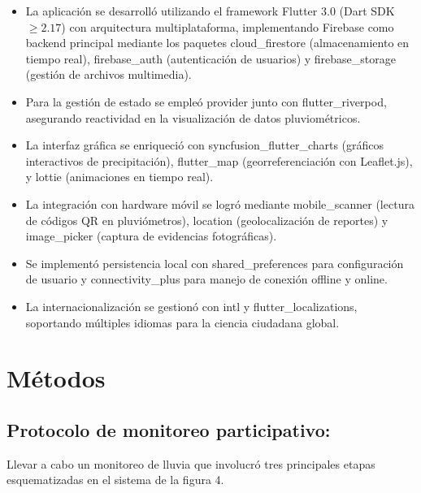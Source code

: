 \begin{itemize}
    \item La aplicación se desarrolló utilizando el framework Flutter 3.0 (Dart SDK $\geq2.17$) con arquitectura multiplataforma, implementando Firebase como backend principal mediante los paquetes cloud\_firestore (almacenamiento en tiempo real), firebase\_auth (autenticación de usuarios) y firebase\_storage (gestión de archivos multimedia). 

    \item Para la gestión de estado se empleó provider junto con flutter\_riverpod, asegurando reactividad en la visualización de datos pluviométricos. 
    
    \item La interfaz gráfica se enriqueció con syncfusion\_flutter\_charts (gráficos interactivos de precipitación), flutter\_map (georreferenciación con Leaflet.js), y lottie (animaciones en tiempo real). 
    
    \item La integración con hardware móvil se logró mediante mobile\_scanner (lectura de códigos QR en pluviómetros), location (geolocalización de reportes) y image\_picker (captura de evidencias fotográficas). 
    
    \item Se implementó persistencia local con shared\_preferences para configuración de usuario y connectivity\_plus para manejo de conexión offline y online. 
    
    \item La internacionalización se gestionó con intl y flutter\_localizations, soportando múltiples idiomas para la ciencia ciudadana global.
\end{itemize}




\section{Métodos}


\subsection{Protocolo de monitoreo participativo:}

Llevar a cabo un monitoreo de lluvia que involucró tres principales etapas esquematizadas en el sistema de la figura 4.


